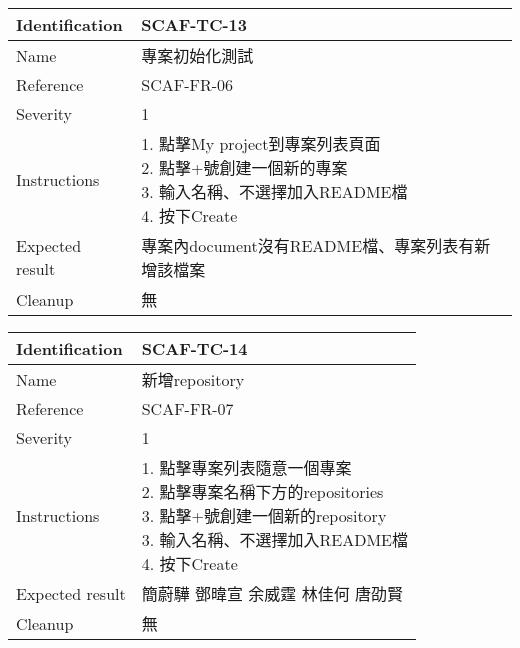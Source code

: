 \documentclass{report}
\begin{document}
\begin{tabularx}{0.9\textwidth}{
  |p{}%
  |p{}|%
  }
  \hline
  \centering Identification &  SCAF-TC-13 \\
  \hline
  \centering Name & 專案初始化測試 \\
  \hline
  \centering Reference & SCAF-FR-06 \\
  \hline
  \centering Severity & 1 \\
  \hline
  \centering Instructions & 
  \makecell{
    1. 點擊My project到專案列表頁面  \\
    2. 點擊+號創建一個新的專案  \\
    3. 輸入名稱、不選擇加入README檔  \\
    4. 按下Create
  }\\
  \hline
  \centering Expected result & 專案內document沒有README檔、專案列表有新增該檔案 \\
  \hline
  \centering Cleanup & 無 \\
  \hline
\end{tabularx}
\newline\newline

\begin{tabularx}{0.9\textwidth}{
  |p{}%
  |p{}|%
  }
  \hline
  \centering Identification &  SCAF-TC-14 \\
  \hline
  \centering Name & 新增repository \\
  \hline
  \centering Reference & SCAF-FR-07 \\
  \hline
  \centering Severity & 1 \\
  \hline
  \centering Instructions & 
  \makecell{
    1. 點擊專案列表隨意一個專案 \\
    2. 點擊專案名稱下方的repositories \\
    3. 點擊+號創建一個新的repository \\
    3. 輸入名稱、不選擇加入README檔  \\
    4. 按下Create
  }\\
  \hline
  \centering Expected result & 簡蔚驊 \! 鄧暐宣 \! 余威霆 \! 林佳何 \! 唐劭賢 \\
  \hline
  \centering Cleanup & 無 \\
  \hline
\end{tabularx}
\newline\newline
\end{document}
